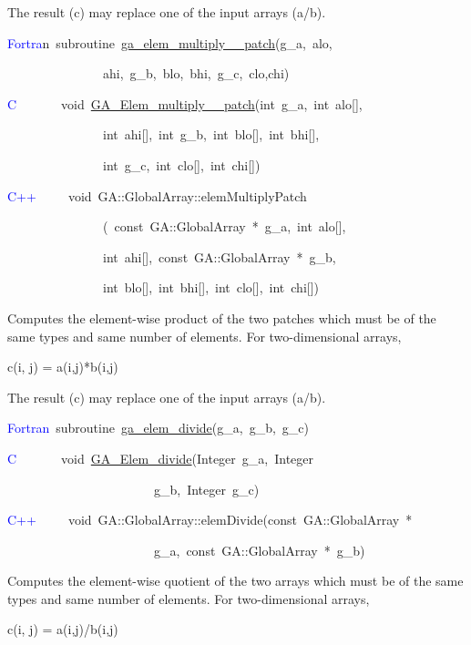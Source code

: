 The result (c) may replace one of the input arrays (a/b). 
\begin{lyxcode}
\textcolor{blue}{Fortra}n~subroutine~\href{http://www.emsl.pnl.gov/docs/global/ga_ops.html\#ga_elem_multiply_patch}{ga\_{}elem\_{}multiply\_{}\_{}patch}(g\_a,~alo,~

~~~~~~~~~~~~~~~ahi,~g\_b,~blo,~bhi,~g\_c,~clo,chi)~

\textcolor{blue}{C}~~~~~~~void~\href{http://www.emsl.pnl.gov/docs/global/c_nga_ops.html\#ga_elem_multiply_patch}{GA\_{}Elem\_{}multiply\_{}\_{}patch}(int~g\_a,~int~alo{[}{]},~

~~~~~~~~~~~~~~~int~ahi{[}{]},~int~g\_b,~int~blo{[}{]},~int~bhi{[}{]},

~~~~~~~~~~~~~~~int~g\_c,~int~clo{[}{]},~int~chi{[}{]})~

\textcolor{blue}{C++~}~~~~void~GA::GlobalArray::elemMultiplyPatch

~~~~~~~~~~~~~~~(~const~GA::GlobalArray~{*}~g\_a,~int~alo{[}{]},~

~~~~~~~~~~~~~~~int~ahi{[}{]},~const~GA::GlobalArray~{*}~g\_b,~

~~~~~~~~~~~~~~~int~blo{[}{]},~int~bhi{[}{]},~int~clo{[}{]},~int~chi{[}{]})
\end{lyxcode}
Computes the element-wise product of the two patches which must be
of the same types and same number of elements. For two-dimensional
arrays,

c(i, j) = a(i,j){*}b(i,j)

The result (c) may replace one of the input arrays (a/b).
\begin{lyxcode}
\textcolor{blue}{Fortran}~subroutine~\href{http://www.emsl.pnl.gov/docs/global/ga_ops.html\#ga_elem_divide}{ga\_{}elem\_{}divide}(g\_a,~g\_b,~g\_c)~

\textcolor{blue}{C}~~~~~~~void~\href{http://www.emsl.pnl.gov/docs/global/c_nga_ops.html\#ga_elem_divide}{GA\_{}Elem\_{}divide}(Integer~g\_a,~Integer~

~~~~~~~~~~~~~~~~~~~~~~~g\_b,~Integer~g\_c)

\textcolor{blue}{C++}~~~~~void~GA::GlobalArray::elemDivide(const~GA::GlobalArray~{*}~

~~~~~~~~~~~~~~~~~~~~~~~g\_a,~const~GA::GlobalArray~{*}~g\_b)
\end{lyxcode}
Computes the element-wise quotient of the two arrays which must be
of the same types and same number of elements. For two-dimensional
arrays,

c(i, j) = a(i,j)/b(i,j)


